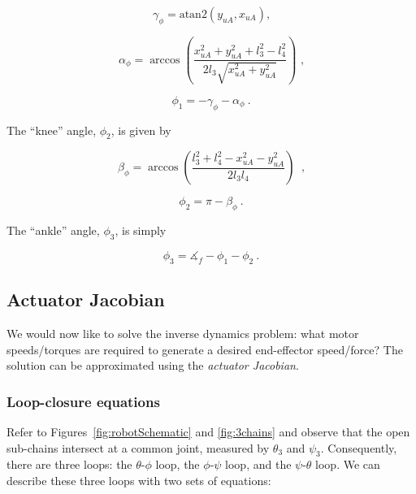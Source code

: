 \documentclass{report}
\begin{document}
\begin{equation*}
\gamma_\phi = \text{atan2}(y_{uA}, x_{uA}) \text{,}
\end{equation*}

\begin{equation*}
\alpha_\phi = \arccos{\left( \frac{x_{uA}^2 + y_{uA}^2 + l_3^2 - l_4^2}{2 l_3 \sqrt{x_{uA}^2 + y_{uA} ^2}}\right) } \text{\ ,}
\end{equation*}

\begin{equation}
\phi_1 = -\gamma_\phi - \alpha_\phi\ \text{.}
\end{equation}

The ``knee'' angle, $\phi_2$, is given by

\begin{equation*}
\beta_\phi = \arccos{\left( \frac{l_3^2 + l_4^2 - x_{uA}^2 - y_{uA} ^2}{2 l_3 l_4}\right) }\ \text{ ,}
\end{equation*}

\begin{equation}
\phi_2 = \pi - \beta_\phi\ \text{.}
\end{equation}

The ``ankle'' angle, $\phi_3$, is simply

\begin{equation}
\phi_3 = \measuredangle_f - \phi_1 - \phi_2\ \text{.}
\end{equation}

\subsection[Actuator Jacobian]{Actuator Jacobian}\label{sec:actuatorJacobian}
We would now like to solve the inverse dynamics problem: what motor speeds/torques are required to generate a desired end-effector speed/force? The solution can be approximated using the \textit{actuator Jacobian}.

\subsubsection[Loop-closure equations]{Loop-closure equations}
Refer to Figures~\ref{fig:robotSchematic} and \ref{fig:3chains} and observe that the open sub-chains intersect at a common joint, measured by $\theta_{3}$ and $\psi_{3}$. Consequently, there are three loops: the $\theta$-$\phi$ loop, the $\phi$-$\psi$ loop, and the $\psi$-$\theta$ loop. We can describe these three loops with two sets of equations:
\end{document}
